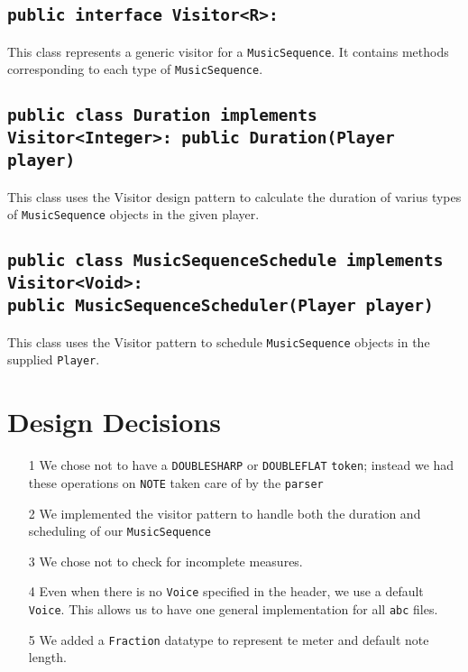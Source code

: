 \documentclass{article}
\begin{document}
\subsection*{{\tt public interface Visitor<R>:}}
This class represents a generic visitor for a {\tt MusicSequence}. It contains methods corresponding to each type of {\tt MusicSequence}.

\subsection*{{\tt public class Duration implements Visitor<Integer>: public Duration(Player player)}}
This class uses the Visitor design pattern to calculate the duration of varius types of {\tt MusicSequence} objects in the given player.

\subsection*{{\tt public class MusicSequenceSchedule implements Visitor<Void>:\\ public MusicSequenceScheduler(Player player)}}
This class uses the Visitor pattern to schedule {\tt MusicSequence} objects in the supplied {\tt Player}.


\section{Design Decisions}	
	\begin{itemize}
	\item[1] We chose not to have a \texttt{DOUBLESHARP} or \texttt{DOUBLEFLAT} {\tt token}; instead we had these operations on \texttt{NOTE} taken care of by the {\tt parser}
	\item[2] We implemented the visitor pattern to handle both the duration and scheduling of our {\tt MusicSequence}
	\item[3] We chose not to check for incomplete measures.
	\item[4] Even when there is no {\tt Voice} specified in the header, we use a default {\tt Voice}. This allows us to have one general implementation for all {\tt abc} files.
	\item[5] We added a {\tt Fraction} datatype to represent te meter and default note length.\
	\end{itemize}
\end{document}
